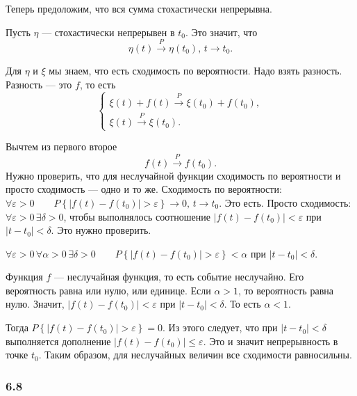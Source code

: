 Теперь предоложим, что вся сумма стохастически непрерывна.

Пусть $ \eta $ --- стохастически непрерывен в $t_0$.
Это значит, что
$$ \eta \left( t \right) \overset{P}{ \to } \eta \left( t_0 \right), \,
  t \to t_0.$$

Для $ \eta $ и $ \xi $ мы знаем, что есть сходимость по вероятности.
Надо взять разность.
Разность --- это $f$, то есть
$$ \begin{cases}
    \xi \left( t \right) + f \left( t \right) \overset{P}{ \to }
    \xi \left( t_0 \right) + f \left( t_0 \right), \\
    \xi \left( t \right) \overset{P}{ \to } \xi \left( t_0 \right).
  \end{cases}$$

Вычтем из первого второе
$$f \left( t \right) \overset{P}{ \to }
  f \left( t_0 \right).$$
Нужно проверить, что для неслучайной функции сходимость по вероятности и просто сходимость ---
одно и то же.
Сходимость по вероятности:
$ \forall \varepsilon > 0 \qquad
  P \left\{ \left| f \left( t \right) - f \left( t_0 \right) \right| > \varepsilon \right\} \to 0,
  \, t \to t_0$.
Это есть.
Просто сходимость: $ \forall \varepsilon > 0 \, \exists \delta > 0$,
чтобы выполнялось соотношение
$ \left| f \left( t \right) - f \left( t_0 \right) \right| <
  \varepsilon $
при $ \left| t - t_0 \right| < \delta $.
Это нужно проверить.

$ \forall \varepsilon > 0 \, \forall \alpha > 0 \, \exists \delta > 0 \qquad
  P \left\{ \left| f \left( t \right) - f \left( t_0 \right) \right| > \varepsilon \right\} <
  \alpha $
при $ \left| t - t_0 \right| < \delta $.

Функция $f$ --- неслучайная функция, то есть событие неслучайно.
Его вероятность равна или нулю, или единице.
Если $ \alpha > 1$, то вероятность равна нулю.
Значит, $ \left| f \left( t \right) - f \left( t_0 \right) \right| < \varepsilon $ при
$ \left| t - t_0 \right| <
  \delta $.
То есть $ \alpha < 1$.

Тогда
$P \left\{ \left| f \left( t \right) - f \left( t_0 \right) \right| > \varepsilon \right\} =
  0$.
Из этого следует, что при $ \left| t - t_0 \right| < \delta $ выполняется дополнение
$ \left| f \left( t \right) - f \left( t_0 \right) \right| \leq
  \varepsilon $.
Это и значит непрерывность в точке $t_0$.
Таким образом, для неслучайных величин все сходимости равносильны.

\subsubsection*{6.8}

